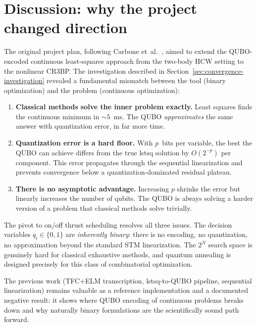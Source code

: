 \documentclass[8pt,a4paper]{article}
\theoremstyle{definition}
\theoremstyle{remark}
\begin{document}
\section{Discussion: why the project changed direction}\label{sec:discussion-pivot}

The original project plan, following Carbone et~al.~\cite{Carbone2025},
aimed to extend the QUBO-encoded continuous least-squares approach
from the two-body HCW setting to the nonlinear CR3BP.
The investigation described in
Section~\ref{sec:convergence-investigation} revealed a fundamental
mismatch between the tool (binary optimization) and the problem
(continuous optimization):

\begin{enumerate}[leftmargin=1.5em]
  \item \textbf{Classical methods solve the inner problem exactly.}
    Least squares finds the continuous minimum in $\sim 5$~ms.
    The QUBO \emph{approximates} the same answer with quantization
    error, in far more time.

  \item \textbf{Quantization error is a hard floor.}
    With $p$~bits per variable, the best the QUBO can achieve
    differs from the true lstsq solution by $O(2^{-p})$ per
    component.  This error propagates through the sequential
    linearization and prevents convergence below a
    quantization-dominated residual plateau.

  \item \textbf{There is no asymptotic advantage.}
    Increasing $p$ shrinks the error but linearly increases the
    number of qubits.  The QUBO is always solving a harder version
    of a problem that classical methods solve trivially.
\end{enumerate}

The pivot to on/off thrust scheduling resolves all three issues.
The decision variables $q_i \in \{0,1\}$ are \emph{inherently binary}:
there is no encoding, no quantization, no approximation beyond the
standard STM linearization.  The $2^N$ search space is genuinely hard
for classical exhaustive methods, and quantum annealing is designed
precisely for this class of combinatorial optimization.

The previous work (TFC+ELM transcription, lstsq-to-QUBO pipeline,
sequential linearization) remains valuable as a reference
implementation and a documented negative result: it shows where QUBO
encoding of continuous problems breaks down and why naturally binary
formulations are the scientifically sound path forward.
\end{document}
